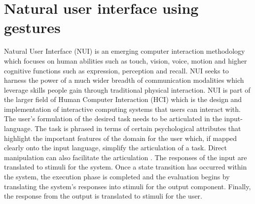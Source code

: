 \section{Natural user interface using gestures}
Natural User Interface (NUI) is an emerging computer interaction methodology which focuses on human abilities such as touch, vision, voice, motion and higher cognitive functions such as expression, perception and recall. 
NUI seeks to harness the power of a much wider breadth of communication modalities which leverage skills people gain through traditional physical interaction. NUI is part of the larger field of Human Computer Interaction (HCI) which is the design and implementation of interactive computing systems that users can interact with. 
The user's formulation of the desired task needs to be articulated in the input-language. The task is phrased in terms of certain psychological attributes that highlight the important features of the domain for the user which, if mapped clearly onto the input language, simplify the articulation of a task. Direct manipulation can also facilitate the articulation \cite{Dix2009}.
The responses of the input are translated to stimuli for the system. Once a state transition has occurred within the system, the execution phase is completed and the evaluation begins by translating the system's responses into stimuli for the output component. Finally, the response from the output is translated to stimuli for the user. 

